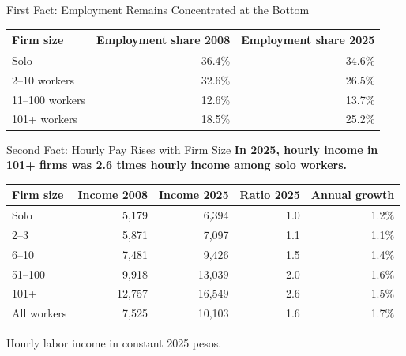 \documentclass[aspectratio=169,11pt]{beamer}
\newcommand{\source}[1]{}
\newcommand{\idea}[1]{\textbf{\color{cjcblue}#1}}
\newcommand{\bigstat}[3]{%
  \begin{center}
    {\Huge\bfseries\color{#3}#1}\\[-0.02cm]
    {\small #2}
  \end{center}
}
\begin{document}
\begin{frame}{First Fact: Employment Remains Concentrated at the Bottom}

  \vspace{0.45cm}
  \begin{center}
  \small
  \begin{tabular}{lrr}
    \toprule
    Firm size & Employment share 2008 & Employment share 2025 \\
    \midrule
    Solo & 36.4\% & 34.6\% \\
    2--10 workers & 32.6\% & 26.5\% \\
    11--100 workers & 12.6\% & 13.7\% \\
    101+ workers & 18.5\% & 25.2\% \\
    \bottomrule
  \end{tabular}
  \end{center}

  \source{Source: authors' calculations using GEIH.}
\end{frame}

\begin{frame}{Second Fact: Hourly Pay Rises with Firm Size}
  \idea{In 2025, hourly income in 101+ firms was 2.6 times hourly income among solo workers.}

  \vspace{0.25cm}
  \begin{center}
  \small
  \begin{tabular}{lrrrr}
    \toprule
    Firm size & Income 2008 & Income 2025 & Ratio 2025 & Annual growth \\
    \midrule
    Solo & 5,179 & 6,394 & 1.0 & 1.2\% \\
    2--3 & 5,871 & 7,097 & 1.1 & 1.1\% \\
    6--10 & 7,481 & 9,426 & 1.5 & 1.4\% \\
    51--100 & 9,918 & 13,039 & 2.0 & 1.6\% \\
    101+ & 12,757 & 16,549 & 2.6 & 1.5\% \\
    \addlinespace
    All workers & 7,525 & 10,103 & 1.6 & 1.7\% \\
    \bottomrule
  \end{tabular}
  \end{center}

  {\small Hourly labor income in constant 2025 pesos.\par}
  \source{Source: authors' calculations using GEIH.}
\end{frame}
\end{document}
